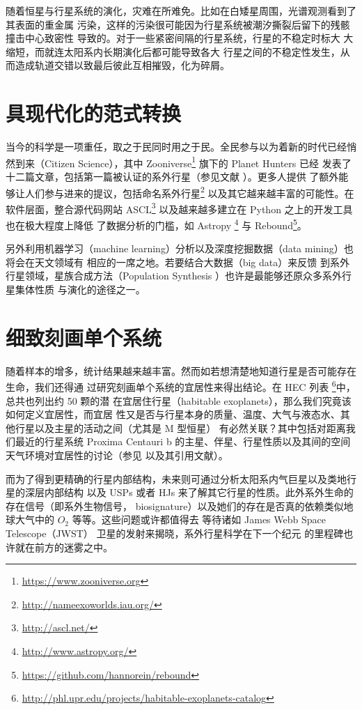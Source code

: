 随着恒星与行星系统的演化，灾难在所难免。比如在白矮星周围，光谱观测看到了其表面的重金属
污染\cite{Barstow2014}，这样的污染很可能因为行星系统被潮汐撕裂后留下的残骸撞击中心致密性
导致的\cite{Vanderburg2015,Boyajian2016}。对于一些紧密间隔的行星系统，行星的不稳定时标大
大缩短\cite{Lissauer2011,Lovis2011,MacDonald2016}，而就连太阳系内长期演化后都可能导致各大
行星之间的不稳定性发生，从而造成轨道交错以致最后彼此互相摧毁，化为碎屑\cite{Laskar1988,Laskar1990}。


\section{具现代化的范式转换}

当今的科学是一项重任，取之于民同时用之于民。全民参与以为着新的时代已经悄然到来（Citizen 
Science），其中 Zooniverse\footnote{\url{https://www.zooniverse.org}} 旗下的 Planet Hunters 已经
发表了十二篇文章，包括第一篇被认证的系外行星（参见文献  ）。更多人提供
了额外能够让人们参与进来的提议，包括命名系外行星\footnote{\url{http://nameexoworlds.iau.org/}}
以及其它越来越丰富的可能性\cite{Hessman2010,Marshall2015}。在软件层面，整合源代码网站 
ASCL\footnote{\url{http://ascl.net/}} 以及越来越多建立在 Python 之上的开发工具也在极大程度上降低
了数据分析的门槛，如 Astropy \footnote{\url{http://www.astropy.org/}} 与 
Rebound\footnote{\url{https://github.com/hannorein/rebound}}。

另外利用机器学习（machine learning）分析以及深度挖掘数据（data mining）也将会在天文领域有
相应的一席之地\cite{Ball2010,McCauliff2015,Thompson2015}。若要结合大数据（big data）来反馈
到系外行星领域，星族合成方法（Population Synthesis ）也许是最能够还原众多系外行星集体性质
与演化的途径之一\cite{Benz2014,Mordasini2009}。

\section{细致刻画单个系统}

随着样本的增多，统计结果越来越丰富。然而如若想清楚地知道行星是否可能存在生命，我们还得通
过研究刻画单个系统的宜居性来得出结论。在 HEC 列表
\footnote{\url{http://phl.upr.edu/projects/habitable-exoplanets-catalog}}中，总共也列出约 50 颗的潜
在宜居住行星（habitable exoplanets），那么我们究竟该如何定义宜居性\cite{Kasting1993}，而宜居
性又是否与行星本身的质量、温度、大气与液态水、其他行星以及主星的活动之间（尤其是 M 型恒星）
有必然关联\cite{Kasting2003,Segura2005,Scalo2007}？其中包括对距离我们最近的行星系统 Proxima 
Centauri b 的主星、伴星、行星性质以及其间的空间天气环境对宜居性的讨论（参见 
\cite{AngladaEscude2016} 以及其引用文献）。

而为了得到更精确的行星内部结构，未来则可通过分析太阳系内气巨星以及类地行星的深层内部结构
以及 USPs 或者 HJs 来了解其它行星的性质。此外系外生命的存在信号（即系外生物信号，
biosignature）以及她们的存在是否真的依赖类似地球大气中的 $O_2$ 等等。这些问题或许都值得去
等待诸如 James Webb Space Telescope（JWST） 卫星的发射来揭晓，系外行星科学在下一个纪元
的里程碑也许就在前方的迷雾之中。









